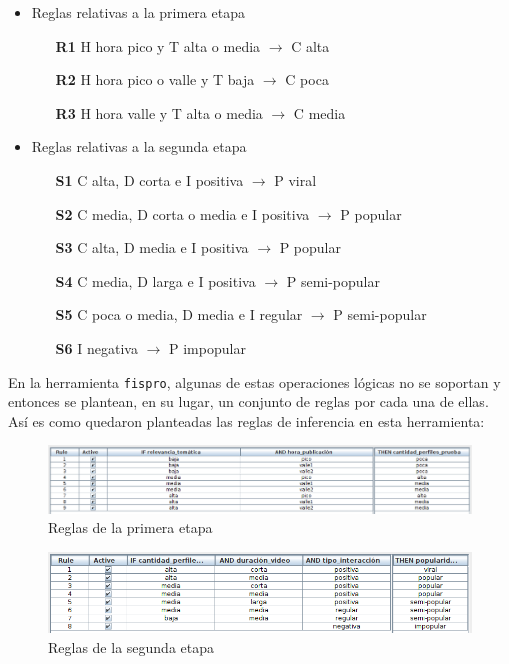 \documentclass{article}
\begin{document}
\begin{itemize}
	\item Reglas relativas a la primera etapa
	\begin{itemize}
		\item [\textbf{R1}] H hora pico y T alta o media $\rightarrow$ C alta 
		\item [\textbf{R2}] H hora pico o valle y T baja $\rightarrow$ C poca 
		\item [\textbf{R3}] H hora valle y T alta o media $\rightarrow$ C media 
	\end{itemize}
	\item Reglas relativas a la segunda etapa
	\begin{itemize}
		\item [\textbf{S1}] C alta, D corta e I positiva $\rightarrow$ P viral
		\item [\textbf{S2}] C media, D corta o media e I positiva $\rightarrow$ P popular
		\item [\textbf{S3}] C alta, D media e I positiva $\rightarrow$ P popular
		\item [\textbf{S4}] C media, D larga e I positiva $\rightarrow$ P semi-popular
		\item [\textbf{S5}] C poca o media, D media e I regular $\rightarrow$ P semi-popular
		\item [\textbf{S6}] I negativa $\rightarrow$ P impopular
	\end{itemize}
\end{itemize}


En la herramienta \verb|fispro|, algunas de estas operaciones lógicas no se soportan y entonces se plantean, en su lugar, un conjunto de reglas por cada una de ellas. Así es como quedaron planteadas las reglas de inferencia en esta herramienta:


\begin{figure}[H]
		\centering
		\includegraphics*[scale=0.31]{./Images/rules1.png}
		\caption{Reglas de la primera etapa}
\end{figure}
	
\begin{figure}[H]
		\centering
		\includegraphics*[scale=0.4]{./Images/rules2.png}
		\caption{Reglas de la segunda etapa}
\end{figure}
\end{document}
